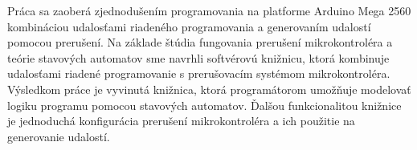 
Práca sa zaoberá zjednodušením programovania na platforme Arduino Mega 2560 kombináciou udalosťami riadeného programovania a generovaním udalostí pomocou prerušení.
Na základe štúdia fungovania prerušení mikrokontroléra a teórie stavových automatov sme navrhli softvérovú knižnicu, ktorá kombinuje udalosťami riadené programovanie
s prerušovacím systémom mikrokontroléra.
Výsledkom práce je vyvinutá knižnica, ktorá programátorom umožňuje modelovať logiku programu pomocou stavových automatov. Ďalšou funkcionalitou knižnice je
jednoduchá konfigurácia prerušení mikrokontroléra a ich použitie na generovanie udalostí.
